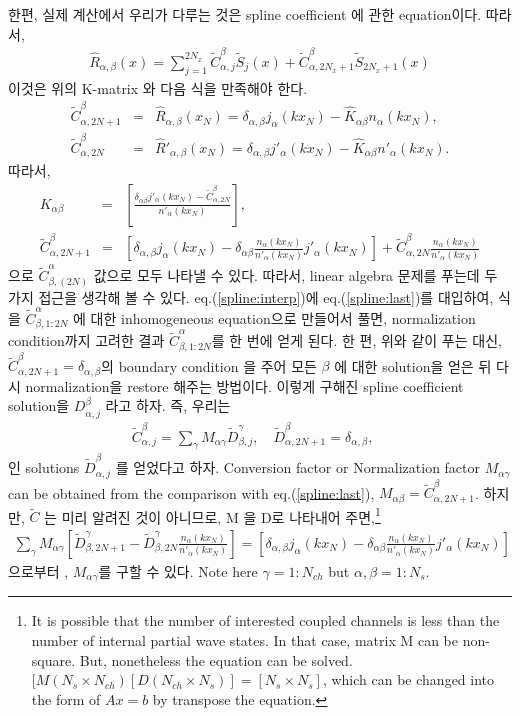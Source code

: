 \documentclass[10pt]{book}
\newcommand{\bea}{\begin{eqnarray}}
\newcommand{\eea}{\end{eqnarray}}
\newcommand{\no}{\nonumber \\}
\begin{document}
한편, 실제 계산에서 우리가 다루는 것은 spline coefficient 에 관한 equation이다. 따라서, 
\bea 
\hat{R}_{\alpha,\beta}(x)=\sum_{j=1}^{2N_x} \tilde{C}^{\beta}_{\alpha,j} \tilde{S}_j(x)
                           +\tilde{C}^{\beta}_{\alpha,2N_x+1} \tilde{S}_{2N_x+1}(x)
\eea 
이것은 위의 K-matrix 와 다음 식을 만족해야 한다. 
\bea 
\tilde{C}^{\beta}_{\alpha,2N+1}&=& \hat{R}_{\alpha,\beta}(x_N)
                                 =\delta_{\alpha,\beta} j_{\alpha}(kx_N)
                                 -\hat{K}_{\alpha\beta} n_{\alpha}(kx_N),\no  
\tilde{C}^{\beta}_{\alpha,2N}&=& \hat{R}'_{\alpha,\beta}(x_N)
                                 =\delta_{\alpha,\beta} j'_{\alpha}(kx_N)
                                 -\hat{K}_{\alpha\beta} n'_{\alpha}(kx_N).
\eea 
따라서, 
\bea 
\label{spline:last}
K_{\alpha\beta}&=&\left[
    \frac{\delta_{\alpha\beta}j'_\alpha(kx_N)-\tilde{C}^{\beta}_{\alpha,2N}}
    {n'_\alpha(kx_N)}      \right],
\no 
\tilde{C}^{\beta}_{\alpha,2N+1}&=&
 \left[\delta_{\alpha,\beta} j_{\alpha}(kx_N)
       -\delta_{\alpha\beta}\frac{n_\alpha(kx_N)}{n'_\alpha(kx_N)} j'_{\alpha}(kx_N)\right] 
   +\tilde{C}^\beta_{\alpha,2N} \frac{n_\alpha(kx_N)}{n'_\alpha(kx_N)}    
\eea 
으로 $\tilde{C}^\alpha_{\beta,(2N)}$ 값으로 모두 나타낼 수 있다. 따라서, linear algebra 문제를 
푸는데 두 가지 접근을 생각해 볼 수 있다. eq.(\ref{spline:interp})에 eq.(\ref{spline:last})를 
대입하여, 식을 $\tilde{C}^\alpha_{\beta,1:2N}$ 에 대한 inhomogeneous equation으로 만들어서 
풀면, normalization condition까지 고려한 결과 $\tilde{C}^\alpha_{\beta,1:2N}$를 한 번에 
얻게 된다. 한 편, 위와 같이 푸는 대신, 
$\tilde{C}^\beta_{\alpha,2N+1}=\delta_{\alpha,\beta}$의 boundary condition 을 주어 
모든 $\beta$ 에 대한 solution을 얻은 뒤 다시 normalization을 restore 해주는 방법이다. 
이렇게 구해진 spline coefficient solution을 $D^\beta_{\alpha,j}$ 라고 하자. 
즉, 우리는 
\bea 
\label{spline:CD}
\tilde{C}^\beta_{\alpha,j}=\sum_{\gamma} M_{\alpha\gamma}\tilde{D}^\gamma_{\beta,j}
,\quad 
\tilde{D}^\beta_{\alpha,2N+1}= \delta_{\alpha,\beta},
\quad 
\eea 
인 solutions $\tilde{D}^\beta_{\alpha,j}$ 를 얻었다고 하자. 
Conversion factor or Normalization factor $M_{\alpha\gamma}$ can be obtained from
the comparison with eq.(\ref{spline:last}), $M_{\alpha\beta}=\tilde{C}^\beta_{\alpha,2N+1}$.
하지만, $\tilde{C}$ 는 미리 알려진 것이 아니므로, M 을 D로 나타내어 주면,\footnote{
It is possible that the number of interested coupled channels is less than 
the number of internal partial wave states. In that case, matrix M can be non-square.
But, nonetheless the equation can be solved.
$ [M(N_s\times N_{ch}) [D(N_{ch}\times N_s)]=[N_s\times N_s]$, which can be 
changed into the form of $Ax=b$ by transpose the equation. 

}
\bea 
\label{spline:M}
\sum_{\gamma} M_{\alpha\gamma}\left[\tilde{D}^\gamma_{\beta,2N+1}-
                        \tilde{D}^\gamma_{\beta,2N}\frac{n_\alpha(kx_N)}{n'_\alpha(kx_N)}\right] 
 =\left[\delta_{\alpha,\beta} j_{\alpha}(kx_N)
        -\delta_{\alpha\beta}\frac{n_\alpha(kx_N)}{n'_\alpha(kx_N)} j'_{\alpha}(kx_N)\right]  
\eea  
으로부터 , $M_{\alpha\gamma}$를 구할 수 있다. Note here $\gamma=1:N_{ch}$ but $\alpha,\beta=1:N_s$.
\end{document}
